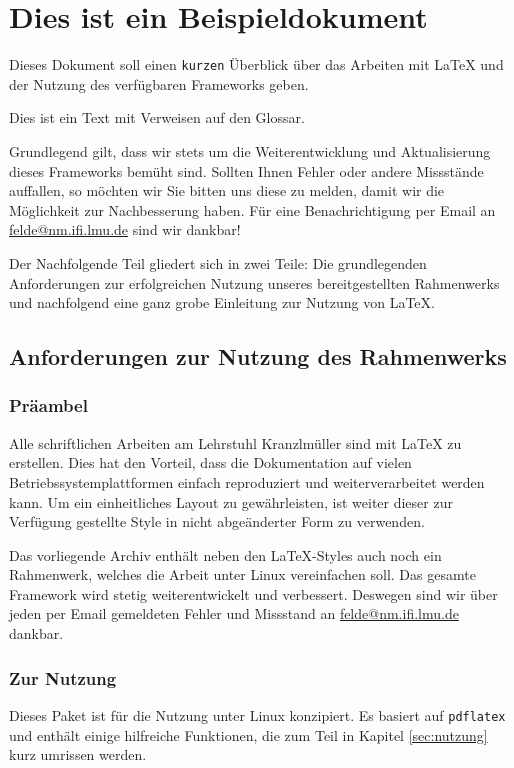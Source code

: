 \chapter{Dies ist ein Beispieldokument}
Dieses Dokument soll einen \texttt{kurzen} Überblick über das Arbeiten
mit \LaTeX \index{\LaTeX} und der Nutzung des verfügbaren Frameworks geben.

Dies ist ein Text  mit Verweisen auf den Glossar.


Grundlegend gilt, dass wir stets um die Weiterentwicklung und
Aktualisierung dieses Frameworks bemüht sind. Sollten Ihnen Fehler
oder andere Missstände auffallen, so möchten wir Sie bitten uns diese
zu melden, damit wir die Möglichkeit zur Nachbesserung haben. Für eine
Benachrichtigung per Email an \url{felde@nm.ifi.lmu.de} sind wir
dankbar!

Der Nachfolgende Teil gliedert sich in zwei Teile: Die grundlegenden
Anforderungen zur erfolgreichen Nutzung unseres bereitgestellten
Rahmenwerks und nachfolgend eine ganz grobe Einleitung zur Nutzung von
\LaTeX \index{\LaTeX}.


\section{Anforderungen zur Nutzung des Rahmenwerks}

\subsection{Präambel}
Alle schriftlichen Arbeiten am Lehrstuhl Kranzlmüller sind mit \LaTeX
\index{\LaTeX} zu erstellen. Dies hat den Vorteil, dass die Dokumentation auf
vielen Betriebssystemplattformen einfach reproduziert und weiterverarbeitet
werden kann. Um ein einheitliches Layout zu gewährleisten, ist weiter dieser
zur Verfügung gestellte Style in nicht abgeänderter Form zu verwenden.

Das vorliegende Archiv enthält neben den LaTeX-Styles auch noch ein
Rahmenwerk, welches die Arbeit unter Linux vereinfachen soll. Das
gesamte Framework wird stetig weiterentwickelt und
verbessert. Deswegen sind wir über jeden per Email gemeldeten Fehler
und Missstand an \url{felde@nm.ifi.lmu.de} dankbar.


\subsection{Zur Nutzung}
Dieses Paket ist für die Nutzung unter Linux konzipiert. Es basiert
auf \texttt{pdflatex} und enthält einige hilfreiche Funktionen, die
zum Teil in Kapitel \ref{sec:nutzung} kurz umrissen werden.

